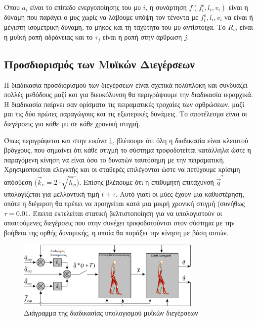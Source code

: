 Όπου $a_i$ είναι το επίπεδο ενεργοποίησης του μυ $i$, η συνάρτηση $f(f^{o}_{i}, l_{i}, v_{i})$ είναι η δύναμη που παράγει ο μυς χωρίς να λάβουμε υπόψη τον τένοντα με $f^{o}_{i}, l_{i}, v_{i}$ να είναι ή μέγιστη ισομετρική δύναμη, το μήκος και τη ταχύτητα του μυ αντίστοιχα. Το $R_{ij}$ είναι η μυϊκή ροπή αδράνειας και το $\tau_{j}$ είναι η ροπή στην άρθρωση $j$.

\subsection{Προσδιορισμός των Μυϊκών Διεγέρσεων}

Η διαδικασία προσδιορισμού των διεγέρσεων είναι σχετικά πολύπλοκη και συνδυάζει πολλές μεθόδους μαζί και για διευκόλυνση θα περιγράψουμε την διαδικασία ιεραρχικά. Η διαδικασία παίρνει σαν ορίσματα τις πειραματικές τροχαίες των αρθρώσεων, μαζί μαι τις δύο πρώτες παραγώγους και τις εξωτερικές δυνάμεις. Το αποτέλεσμα είναι οι διεγέρσεις για κάθε μυ σε κάθε χρονική στιγμή.

Όπως περιγράφεται και στην εικόνα \ref{fig:cmc-diagram}, βλέπουμε ότι όλη η διαδικασία είναι κλειστού βρόγχους, που σημαίνει ότι κάθε στιγμή το σύστημα τροφοδοτείται κατάλληλα ώστε η παραγόμενη κίνηση να είναι όσο το δυνατών ταυτόσημη με την πειραματική. Χρησιμοποιείται  ελεγκτής και οι σταθερές επιλέγονται ώστε να πετύχουμε κρίσιμη απόσβεση ($\overrightarrow{k}_v = 2 \cdot \sqrt{\overrightarrow{h}_p}$). Επίσης βλέπουμε ότι η επιθυμητή επιτάχυνσή $\ddot{\overrightarrow{q}}^{*}$ υπολογίζεται για μελλοντική τιμή $t + \tau $. Αυτό γιατί οι μύες έχουν μια καθυστέρηση, οπότε η διέγερση θα πρέπει να προηγείται κατά μια μικρή χρονική στιγμή (συνήθως $\tau = 0.01$. Έπειτα εκτελείται στατική βελτιστοποίηση για να υπολογιστούν οι απαιτούμενες διεγέρσεις που στην συνέχει τροφοδοτούνται στον σύστημα με την βοήθεια της ορθής δυναμικής, η οποία θα παράξει την κίνηση με βάση αυτών.

\begin{figure}[H]
    \centering
    \includegraphics[width=0.8\textwidth]{methods/fig/cmc-diagram.png}
    \caption{Διάγραμμα της διαδικασίας υπολογισμού μυϊκών διεγέρσεων\cite{thelen06}}
    \label{fig:cmc-diagram}
\end{figure}

